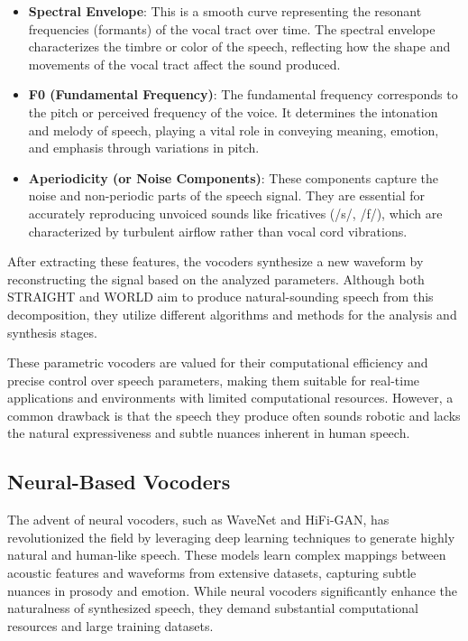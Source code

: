 \documentclass[12pt]{article}
\begin{document}
\begin{itemize}
    \item \textbf{Spectral Envelope}: This is a smooth curve representing the resonant frequencies (formants) of the vocal tract over time. The spectral envelope characterizes the timbre or color of the speech, reflecting how the shape and movements of the vocal tract affect the sound produced.
    
    \item \textbf{F0 (Fundamental Frequency)}: The fundamental frequency corresponds to the pitch or perceived frequency of the voice. It determines the intonation and melody of speech, playing a vital role in conveying meaning, emotion, and emphasis through variations in pitch.
    
    \item \textbf{Aperiodicity (or Noise Components)}: These components capture the noise and non-periodic parts of the speech signal. They are essential for accurately reproducing unvoiced sounds like fricatives (/s/, /f/), which are characterized by turbulent airflow rather than vocal cord vibrations.
\end{itemize}

After extracting these features, the vocoders synthesize a new waveform by reconstructing the signal based on the analyzed parameters. Although both STRAIGHT and WORLD aim to produce natural-sounding speech from this decomposition, they utilize different algorithms and methods for the analysis and synthesis stages.

These parametric vocoders are valued for their computational efficiency and precise control over speech parameters, making them suitable for real-time applications and environments with limited computational resources. However, a common drawback is that the speech they produce often sounds robotic and lacks the natural expressiveness and subtle nuances inherent in human speech.

\subsection{Neural-Based Vocoders}

The advent of neural vocoders, such as WaveNet and HiFi-GAN, has revolutionized the field by leveraging deep learning techniques to generate highly natural and human-like speech. These models learn complex mappings between acoustic features and waveforms from extensive datasets, capturing subtle nuances in prosody and emotion. While neural vocoders significantly enhance the naturalness of synthesized speech, they demand substantial computational resources and large training datasets.
\end{document}
